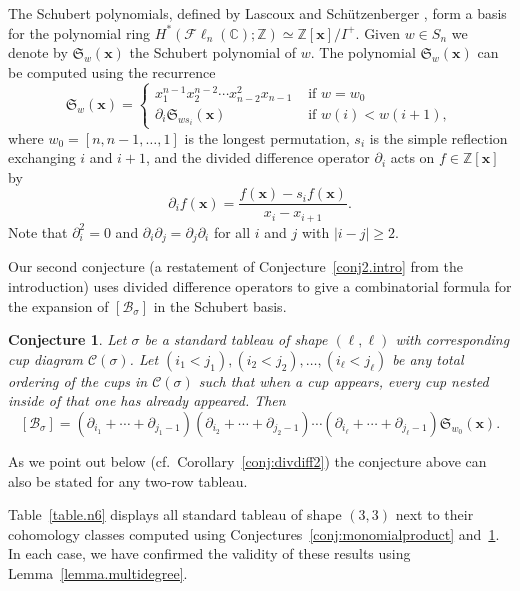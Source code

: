 \documentclass[11pt]{amsart}
\newtheorem{conj}[theorem]{Conjecture}
\theoremstyle{remark}
\theoremstyle{remark}
\theoremstyle{definition}
\theoremstyle{definition}
\theoremstyle{definition}
\numberwithin{equation}{section}
\newcommand{\C}{\mathbb{C}}           %
\newcommand{\Z}{\mathbb{ Z}}           %
\newcommand{\gs}{\sigma}
\newcommand{\cc}{\mathcal{C}}
\newcommand{\SF}{\mathcal{B}}
\newcommand{\cupsigma}{\cc(\gs)}
\newcommand{\Fl}{\mathcal{F}\ell}
\begin{document}
The Schubert polynomials, defined by Lascoux and Schützenberger \cite{LascouxSchutzenberger1982}, form a basis for the polynomial ring  $H^*(\Fl_n(\C); \Z)\simeq \Z[\mathbf{x}]/I^+$. Given $w\in S_n$ we denote by $\mathfrak{S}_w(\mathbf{x})$ the Schubert polynomial of $w$.
The polynomial $\mathfrak{S}_w(\mathbf{x})$ can be computed using the recurrence
$$
\mathfrak{S}_w (\mathbf{x})= \begin{cases}x_1^{n-1} x_2^{n-2} \cdots x_{n-2}^2x_{n-1} & \text { if } w=w_0  \\ \partial_i \mathfrak{S}_{w s_i}(\mathbf{x}) & \text { if } w(i)<w(i+1),\end{cases}
$$
where $w_0 = [n, n-1, \ldots, 1]$ is the longest permutation, $s_i$ is the simple reflection exchanging $i$ and $i+1$, and the divided difference operator $\partial_i$ acts on $f\in \Z[\mathbf{x}]$ by
$$
\partial_i f(\mathbf{x})=\frac{f(\mathbf{x})-s_i f(\mathbf{x})}{x_i-x_{i+1}} .
$$
Note that $\partial_i^2=0$ and $\partial_i \partial_j = \partial_j\partial_i$ for all $i$ and $j$ with $|i-j|\geq 2$. 

Our second conjecture (a restatement of Conjecture~\ref{conj2.intro} from the introduction)  uses divided difference operators to give a combinatorial formula for the expansion of $[\SF_\gs]$ in the Schubert basis.

\begin{conj}\label{conj:divdiff} Let $\gs$ be a standard tableau of shape $(\ell,\ell)$ with corresponding cup diagram $\cupsigma$.  Let $(i_1<j_1), (i_2<j_2), \ldots, (i_\ell<j_\ell)$ be any total ordering of the cups in $\cupsigma$ such that when a cup appears, every cup nested inside of that one has already appeared. 
Then 
\[
[\SF_\gs] = \left( \partial_{i_1} + \cdots + \partial_{j_1-1} \right) \left( \partial_{i_2} + \cdots + \partial_{j_2-1} \right) \cdots  \left( \partial_{i_\ell} + \cdots + \partial_{j_\ell-1} \right)\mathfrak{S}_{w_0}(\mathbf{x}).
\]
\end{conj}

As we point out below (cf.~Corollary~\ref{conj:divdiff2}) the conjecture above can also be stated for any two-row tableau. 


Table~\ref{table.n6} displays all standard tableau of shape $(3,3)$ next to their cohomology classes computed using Conjectures~\ref{conj:monomialproduct} and~\ref{conj:divdiff}. In each case, we have confirmed the validity of these results using Lemma~\ref{lemma.multidegree}.
\end{document}
